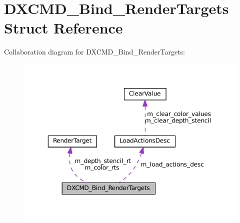 \hypertarget{structDXCMD__Bind__RenderTargets}{}\section{D\+X\+C\+M\+D\+\_\+\+Bind\+\_\+\+Render\+Targets Struct Reference}
\label{structDXCMD__Bind__RenderTargets}


Collaboration diagram for D\+X\+C\+M\+D\+\_\+\+Bind\+\_\+\+Render\+Targets\+:
\nopagebreak
\begin{figure}[H]
\begin{center}
\leavevmode
\includegraphics[width=350pt]{structDXCMD__Bind__RenderTargets__coll__graph}
\end{center}
\end{figure}
